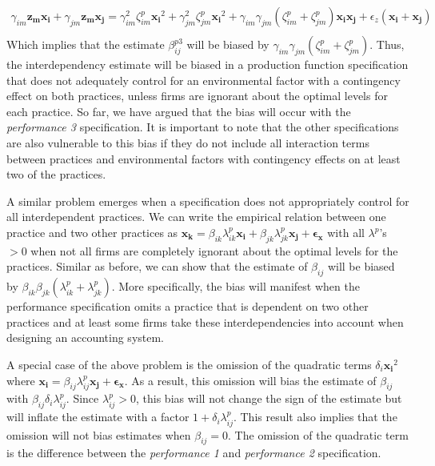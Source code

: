 \documentclass[12pt]{article}
\begin{document}
\begin{align*}
\gamma_{im} \mathbf{z_m} \mathbf{x_i} + \gamma_{jm} \mathbf{z_m} \mathbf{x_j}
= \gamma^2_{im} \zeta^p_{im} \mathbf{x_i}^2 + \gamma^2_{jm} \zeta^p_{jm} \mathbf{x_i}^2 
    + \gamma_{im} \gamma_{jm} (\zeta^p_{im} + \zeta^p_{jm}) \mathbf{x_i x_j} 
    + \epsilon_z ( \mathbf{x_i} + \mathbf{x_j})\\
\end{align*}
Which implies that the estimate $\beta^{p3}_{ij}$ will be biased by $\gamma_{im} \gamma_{jm}(\zeta^p_{im} + \zeta^p_{jm})$. Thus, the interdependency estimate will be biased in a production function specification that does not adequately control for an environmental factor with a contingency effect on both practices, unless firms are ignorant about the optimal levels for each practice. So far, we have argued that the bias will occur with the \emph{performance 3} specification. It is important to note that the other specifications are also vulnerable to this bias if they do not include all interaction terms between practices and environmental factors with contingency effects on at least two of the practices. 

A similar problem emerges when a specification does not appropriately control for all interdependent practices. We can write the empirical relation between one practice and two other practices as $\mathbf{x_k} = \beta_{ik} \lambda^p_{ik} \mathbf{x_i} + \beta_{jk} \lambda^p_{jk} \mathbf{x_j} + \mathbf{\epsilon_x}$ with all $\lambda^p$'s $>0$ when not all firms are completely ignorant about the optimal levels for the practices. Similar as before, we can show that the estimate of $\beta_{ij}$ will be biased by $\beta_{ik} \beta_{jk} (\lambda^p_{ik} + \lambda^p_{jk})$. More specifically, the bias will manifest when the performance specification omits a practice that is dependent on two other practices and at least some firms take these interdependencies into account when designing an accounting system.

A special case of the above problem is the omission of the quadratic terms $\delta_i \mathbf{x_i}^2$ where $\mathbf{x_i} =  \beta_{ij} \lambda^p_{ij} \mathbf{x_j} + \mathbf{\epsilon_x}$. As a result, this omission will bias the estimate of $\beta_{ij}$ with $\beta_{ij} 
\delta_i \lambda^p_{ij}$. Since $\lambda^p_{ij} > 0$, this bias will not change the sign of the estimate but will inflate the estimate with a factor $1 + \delta_i \lambda^p_{ij}$.  This result also implies that the omission will not bias estimates when $\beta_{ij} = 0$. The omission of the quadratic term is the difference between the \emph{performance 1} and \emph{performance 2} specification.
\end{document}
